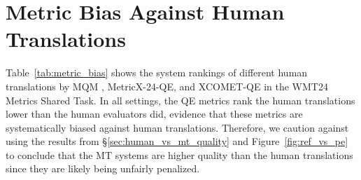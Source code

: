 \section{Metric Bias Against Human Translations}
\label{appendix:metric_bias}

Table~\ref{tab:metric_bias} shows the system rankings of different human translations by MQM \citep[the human-based ground-truth ranking; ][]{lommel2014multidimensional,experts}, MetricX-24-QE, and XCOMET-QE in the WMT24 Metrics Shared Task.
In all settings, the QE metrics rank the human translations lower than the human evaluators did, evidence that these metrics are systematically biased against human translations.
Therefore, we caution against using the results from \S\ref{sec:human_vs_mt_quality} and Figure~\ref{fig:ref_vs_pe} to conclude that the MT systems are higher quality than the human translations since they are likely being unfairly penalized.

